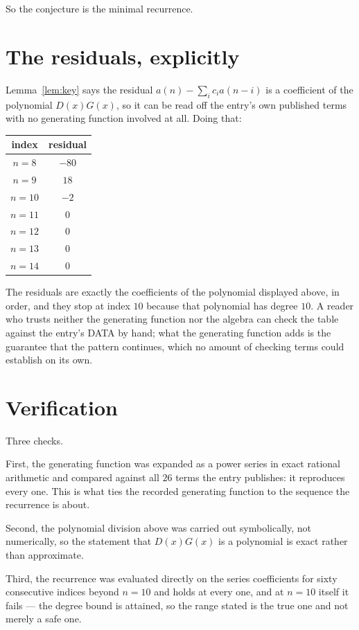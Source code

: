 \documentclass[11pt,a4paper]{article}
\theoremstyle{plain}
\theoremstyle{definition}
\begin{document}
So the conjecture is the minimal recurrence.

\section{The residuals, explicitly}

Lemma~\ref{lem:key} says the residual $a(n)-\sum_ic_ia(n-i)$ is a coefficient of the
polynomial $D(x)G(x)$, so it can be read off the entry's own published terms with no
generating function involved at all. Doing that:
\begin{center}
\begin{tabular}{cc}
index & residual \\ \hline
$n=8$ & $-80$ \\
$n=9$ & $18$ \\
$n=10$ & $-2$ \\
$n=11$ & $0$ \\
$n=12$ & $0$ \\
$n=13$ & $0$ \\
$n=14$ & $0$
\end{tabular}
\end{center}
The residuals are exactly the coefficients of the polynomial displayed above, in order, and
they stop at index $10$ because that polynomial has degree $10$. A reader who trusts
neither the generating function nor the algebra can check the table against the entry's DATA
by hand; what the generating function adds is the guarantee that the pattern continues, which
no amount of checking terms could establish on its own.

\section{Verification}

Three checks.

First, the generating function was expanded as a power series in exact rational arithmetic and
compared against all $26$ terms the entry publishes: it reproduces every one. This is
what ties the recorded generating function to the sequence the recurrence is about.

Second, the polynomial division above was carried out symbolically, not numerically, so the
statement that $D(x)G(x)$ is a polynomial is exact rather than approximate.

Third, the recurrence was evaluated directly on the series coefficients for sixty consecutive
indices beyond $n=10$ and holds at every one, and at $n=10$ itself it fails --- the
degree bound is attained, so the range stated is the true one and not merely a safe one.
\end{document}
